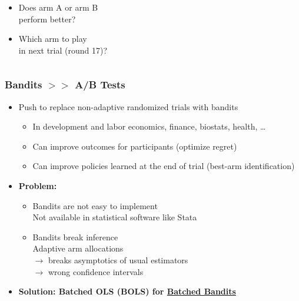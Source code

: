 \documentclass[11pt,table]{beamer}
\begin{document}
\begin{frame}
\begin{columns}
\begin{column}{.5\textwidth}
\begin{itemize}
    \item  Does arm A or arm B\\ perform better?\\[2ex]
    \item Which arm to play\\ in next trial (round 17)?
\end{itemize}
\end{column}
\end{columns}

\end{frame}




\begin{frame}\frametitle{Bandits $>>$ A/B Tests}
\renewcommand{\baselinestretch}{1}

\begin{itemize}
    \item Push to replace non-adaptive randomized trials with bandits
    \begin{itemize}
        \item In development and labor economics, finance, biostats, health, \ldots
        \item Can improve outcomes for participants (optimize regret)
        \item Can improve policies learned at the end of trial (best-arm identification)
    \end{itemize}
    \item \textbf{\textcolor{BrewerRed}{Problem}:}
    \begin{itemize}
        \item Bandits are not easy to implement\\
        Not available in statistical software like Stata
        \item Bandits break inference\\
        Adaptive arm allocations\\ $\rightarrow$ breaks asymptotics of usual estimators\\ $\rightarrow$ wrong confidence intervals
    \end{itemize}
    \item \textbf{{Solution}: Batched OLS (BOLS) for  \href{https://rostam-afschar.de/bbandits/bbandits.htm}{Batched Bandits}}
\end{itemize}

\end{frame}
\end{document}
